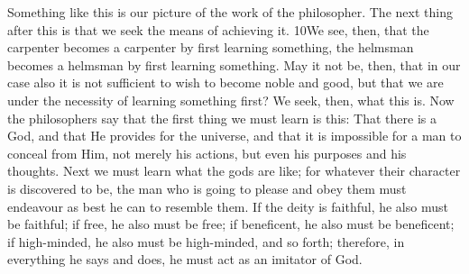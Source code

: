 Something like this is our picture of the work of the philosopher. The next thing after this is that we seek the means of achieving it. 10We see, then, that the carpenter becomes a carpenter by first learning something, the helmsman becomes a helmsman by first learning something. May it not be, then, that in our case also it is not sufficient to wish to become noble and good, but that we are under the necessity of learning something first? We seek, then, what this is. Now the philosophers say that the first thing we must learn is this: That there is a God, and that He provides for the universe, and that it is impossible for a man to conceal from Him, not merely his actions, but even his purposes and his thoughts. Next we must learn what the gods are like; for whatever their character is discovered to be, the man who is going to please and obey them must endeavour as best he can to resemble them. If the deity is faithful, he also must be faithful; if free, he also must be free; if beneficent, he also must be beneficent; if high-minded, he also must be high-minded, and so forth; therefore, in everything he says and does, he must act as an imitator of God.

